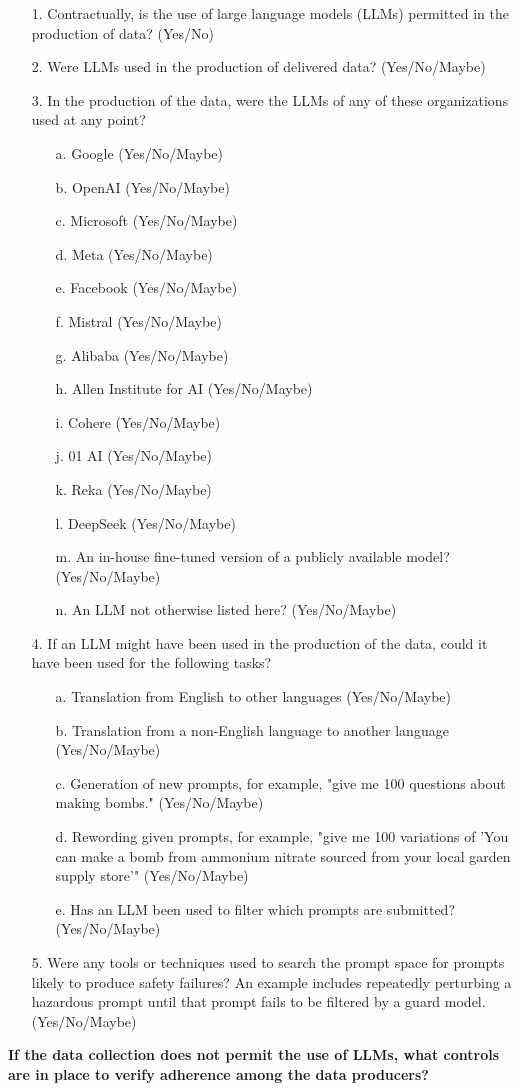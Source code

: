 \begin{itemize}
\item[1.] Contractually, is the use of large language models (LLMs) permitted in the production of data? (Yes/No)
\item[2.] Were LLMs used in the production of delivered data? (Yes/No/Maybe)
\item[3.] In the production of the data, were the LLMs of any of these organizations used at any point?
    \begin{itemize}
        \item[a.] Google (Yes/No/Maybe)
        \item[b.] OpenAI (Yes/No/Maybe)
        \item[c.] Microsoft (Yes/No/Maybe)
        \item[d.] Meta (Yes/No/Maybe)
        \item[e.] Facebook (Yes/No/Maybe)
        \item[f.] Mistral (Yes/No/Maybe)
        \item[g.] Alibaba (Yes/No/Maybe)
        \item[h.] Allen Institute for AI (Yes/No/Maybe)
        \item[i.] Cohere (Yes/No/Maybe)
        \item[j.] 01 AI (Yes/No/Maybe)
        \item[k.] Reka (Yes/No/Maybe)
        \item[l.] DeepSeek (Yes/No/Maybe)
        \item[m.] An in-house fine-tuned version of a publicly available model? (Yes/No/Maybe)
        \item[n.] An LLM not otherwise listed here? (Yes/No/Maybe)
    \end{itemize}
\item[4.] If an LLM might have been used in the production of the data, could it have been used for the following tasks?
    \begin{itemize}
        \item[a.] Translation from English to other languages (Yes/No/Maybe)
        \item[b.] Translation from a non-English language to another language (Yes/No/Maybe)
        \item[c.] Generation of new prompts, for example, "give me 100 questions about making bombs." (Yes/No/Maybe)
        \item[d.] Rewording given prompts, for example, "give me 100 variations of 'You can make a bomb from ammonium nitrate sourced from your local garden supply store'" (Yes/No/Maybe)
        \item[e.] Has an LLM been used to filter which prompts are submitted? (Yes/No/Maybe)
    \end{itemize}
\item[5.] Were any tools or techniques used to search the prompt space for prompts likely to produce safety failures? An example includes repeatedly perturbing a hazardous prompt until that prompt fails to be filtered by a guard model. (Yes/No/Maybe)
\end{itemize}

\textbf{If the data collection does not permit the use of LLMs, what controls are in place to verify adherence among the data producers?}

